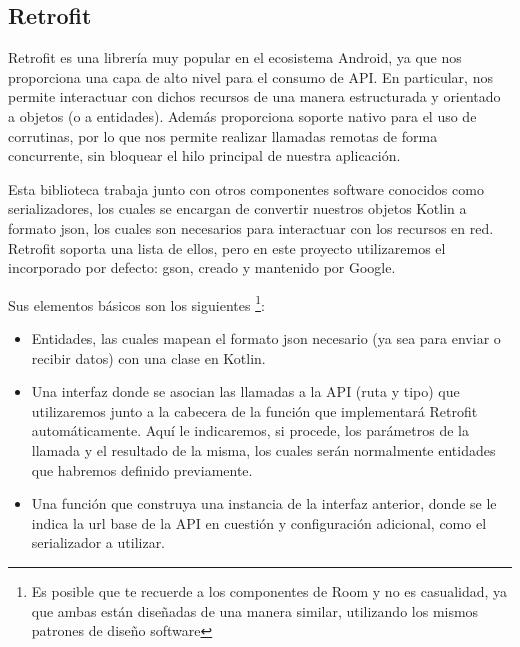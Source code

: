 
        \subsection{Retrofit}
            Retrofit es una librería muy popular en el ecosistema Android, ya que nos proporciona una capa de alto nivel
            para el consumo de API. En particular, nos permite interactuar con dichos recursos de una manera estructurada
            y orientado a objetos (o a entidades). Además proporciona soporte nativo para el uso de corrutinas, por lo
            que nos permite realizar llamadas remotas de forma concurrente, sin bloquear el hilo principal de nuestra
            aplicación.

            Esta biblioteca trabaja junto con otros componentes software conocidos como serializadores, los cuales se 
            encargan de convertir nuestros objetos Kotlin a formato json, los cuales son necesarios para interactuar
            con los recursos en red. Retrofit soporta una lista de ellos, pero en este proyecto utilizaremos el 
            incorporado por defecto: gson, creado y mantenido por Google.

            Sus elementos básicos son los siguientes \cite{noauthor_retrofit_nodate} \footnote{Es posible que te 
            recuerde a los componentes de Room y 
            no es casualidad, ya que ambas están diseñadas de una manera similar, utilizando los mismos patrones de
            diseño software}:
            \begin{itemize}
                \item Entidades, las cuales mapean el formato json necesario (ya sea para enviar o recibir datos) con 
                una clase en Kotlin.
                \item Una interfaz donde se asocian las llamadas a la API (ruta y tipo) que utilizaremos junto a la 
                cabecera de la función que implementará Retrofit automáticamente. Aquí le indicaremos, si procede, los
                parámetros de la llamada y el resultado de la misma, los cuales serán normalmente entidades que habremos
                definido previamente.
                \item Una función que construya una instancia de la interfaz anterior, donde se le indica la url base de
                la API en cuestión y configuración adicional, como el serializador a utilizar.
            \end{itemize}
            
